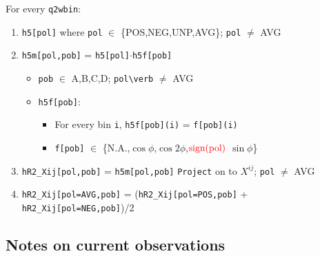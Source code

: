 \documentclass{article}
\numberwithin{equation}{subsection}
\begin{document}
For every \verb|q2wbin|:
\begin{enumerate}
	\item \verb|h5[pol]| where \verb|pol| $\in$ \{POS,NEG,UNP,AVG\}; \verb|pol| $\neq$ AVG
	\item \verb|h5m[pol,pob]| = \verb|h5[pol]|$\cdot$\verb|h5f[pob]| 
		\begin{itemize}
		\item \verb|pob| $\in$ {A,B,C,D}; \verb|pol\verb| $\neq$ AVG
		\item \verb|h5f[pob]|:
			\begin{itemize}
			\item For every bin \verb|i|,  \verb|h5f[pob](i)| = \verb|f[pob](i)|
			\item \verb|f[pob]| $\in$ \{N.A.,$\cos\phi$,$\cos 2\phi$,$\color{red}{\text{sign(pol)}}$ $\sin\phi$\}
			\end{itemize}
		\end{itemize}
	\item \verb|hR2_Xij[pol,pob]| = \verb|h5m[pol,pob]| \verb|Project| on to $X^{ij}$; \verb|pol| $\neq$ AVG
	\item \verb|hR2_Xij[pol=AVG,pob]| = (\verb|hR2_Xij[pol=POS,pob]| + \verb|hR2_Xij[pol=NEG,pob]|)/2
\end{enumerate}

\subsection{Notes on current observations}





\end{document}
